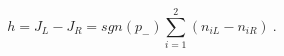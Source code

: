 \begin{equation}
h = J_L - J_R = sgn(p_-) \sum_{i=1}^2 (n_{iL} - n_{iR}) ~.
\label{helicity}
\end{equation}

